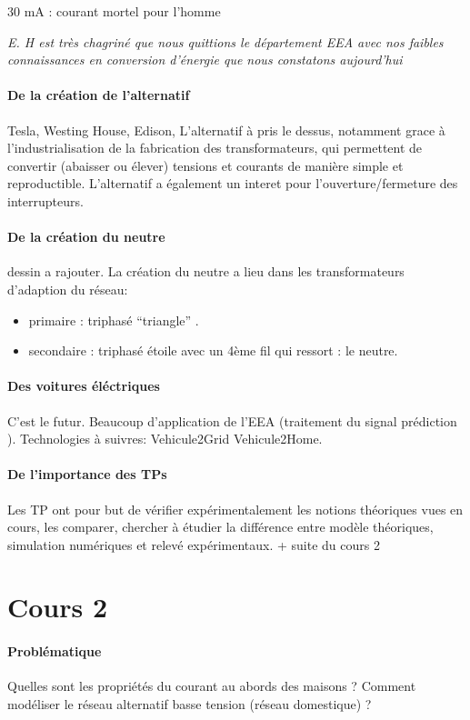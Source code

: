 \documentclass[main.tex]{subfiles}
\begin{document}
{\centering\Huge 30 mA : courant mortel pour l'homme}

\emph{E. H est très chagriné que nous quittions le département EEA avec nos faibles connaissances en conversion d'énergie que nous constatons aujourd'hui}

\paragraph{De la création de l'alternatif}
Tesla, Westing House, Edison,
L'alternatif à pris le dessus, notamment grace à l'industrialisation de la fabrication des transformateurs, qui permettent de convertir (abaisser ou élever) tensions et  courants de manière simple et reproductible. L'alternatif a également un interet pour l'ouverture/fermeture des interrupteurs.

\paragraph{De la création du neutre}
dessin a rajouter.
La création du neutre a lieu dans les transformateurs d'adaption du réseau:
\begin{itemize}
\item primaire : triphasé ``triangle'' .
\item secondaire : triphasé étoile avec un 4ème fil qui ressort : le neutre.
\end{itemize}
\paragraph{Des voitures éléctriques}
C'est le futur. Beaucoup d'application de l'EEA (traitement du signal prédiction ).
Technologies à suivres: Vehicule2Grid Vehicule2Home.
\paragraph{De l'importance des TPs} Les TP ont pour but de vérifier expérimentalement les notions théoriques vues en cours, les comparer, chercher à étudier la différence entre modèle théoriques, simulation numériques et relevé expérimentaux.
+ suite du cours 2


\section{Cours 2}

\paragraph{Problématique}
Quelles sont les propriétés du courant au abords des maisons ? Comment modéliser le réseau alternatif basse tension (réseau domestique) ?
\end{document}
